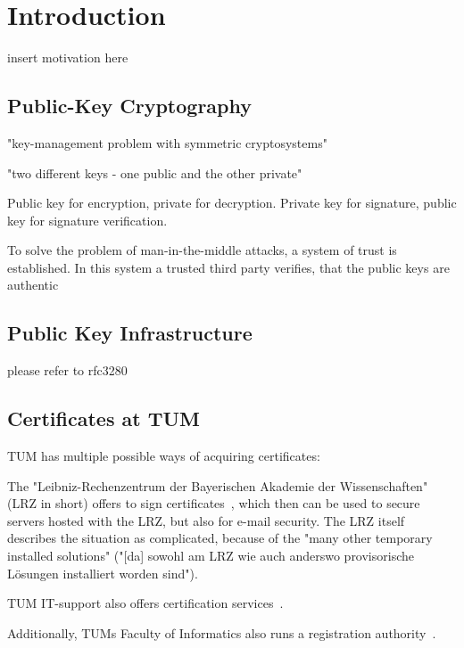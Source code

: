 \chapter{Introduction}\label{ch:introduction}
insert motivation here
\section{Public-Key Cryptography}\label{sec:publicKeyCryptography}

"key-management problem with symmetric cryptosystems"

"two different keys - one public and the other private"~\cite{schneier2007applied, diffie1976new}

Public key for encryption, private for decryption.
Private key for signature, public key for signature verification.

To solve the problem of man-in-the-middle attacks, a system of trust is established.
In this system a trusted third party verifies, that the public keys are authentic

\section{Public Key Infrastructure}\label{sec:publicKeyInfrastructure}
please refer to rfc3280

\section{Certificates at TUM}\label{sec:certificatesAtTum}

TUM has multiple possible ways of acquiring certificates:

The "Leibniz-Rechenzentrum der Bayerischen Akademie der Wissenschaften" (LRZ in short) offers to sign
certificates~\cite{lrzpki}, which then can be used to secure servers hosted with the LRZ, but also for e-mail security.
The LRZ itself describes the situation as complicated, because of the "many other temporary installed solutions"
("[da] sowohl am LRZ wie auch anderswo provisorische Lösungen installiert worden sind").

TUM IT-support also offers certification services~\cite{tumZertifikat}.

Additionally, TUMs Faculty of Informatics also runs a registration authority~\cite{inTumCertificates}.

